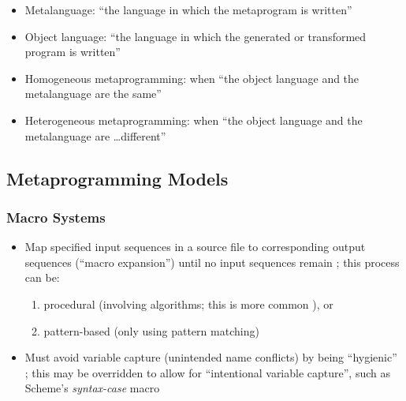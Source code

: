 \begin{itemize}
      \item Metalanguage: ``the language in which the metaprogram is written''
            \cite[p.~113:1]{lilis_survey_2019}
      \item Object language: ``the language in which the generated or
            transformed program is written'' \cite[p.~113:1]{lilis_survey_2019}
      \item Homogeneous metaprogramming: when ``the object language and the
            metalanguage are the same'' \cite[p.~113:1]{lilis_survey_2019}
      \item Heterogeneous metaprogramming: when ``the object language and the
            metalanguage are \dots different'' \cite[p.~113:1]{lilis_survey_2019}
\end{itemize}

\subsection{Metaprogramming Models}
\subsubsection{Macro Systems \cite[p.~113:3-7]{lilis_survey_2019}}
\begin{itemize}
      \item Map specified input sequences in a source file to corresponding
            output sequences (``macro expansion'') until no input sequences
            remain \cite[p.~113:3]{lilis_survey_2019}; this process can be:
            \begin{enumerate}
                  \item procedural (involving algorithms; this is more common
                        \cite[p.~113:31]{lilis_survey_2019}), or
                  \item pattern-based (only using pattern matching)
                        \cite[p.~113:4]{lilis_survey_2019}
            \end{enumerate}
      \item Must avoid variable capture (unintended name conflicts) by being
            ``hygienic'' \cite[p.~113:4]{lilis_survey_2019}; this may be
            overridden to allow for ``intentional variable capture'', such as
            Scheme's \emph{syntax-case} macro \cite[p.~113:5]{lilis_survey_2019}
\end{itemize}

